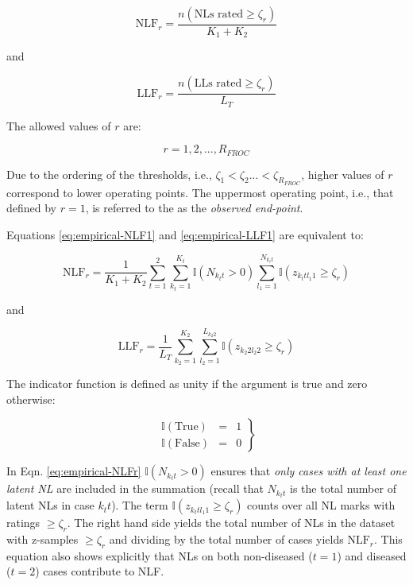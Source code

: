\documentclass[
]{book}
\begin{document}
\begin{equation}
\text{NLF}_r  = \frac{n\left ( \text{NLs rated} \geq \zeta_r\right )}{K_1 + K_2}
\label{eq:empirical-NLF1}
\end{equation}

and

\begin{equation}
\text{LLF}_r  = \frac{n\left ( \text{LLs rated} \geq \zeta_r\right )}{L_T}
\label{eq:empirical-LLF1}
\end{equation}

The allowed values of \(r\) are:

\begin{equation}
r = 1, 2, ...,R_{FROC} 
\label{eq:empirical-range-r}
\end{equation}

Due to the ordering of the thresholds, i.e., \(\zeta_1 < \zeta_2 ... < \zeta_{R_{FROC}}\), higher values of \(r\) correspond to lower operating points. The uppermost operating point, i.e., that defined by \(r = 1\), is referred to the as the \emph{observed end-point}.

Equations \eqref{eq:empirical-NLF1} and \eqref{eq:empirical-LLF1} are equivalent to:

\begin{equation}
\text{NLF}_r  = \frac{1}{K_1+K_2} \sum_{t=1}^{2} \sum_{k_t=1}^{K_t} \mathbb{I} \left ( N_{k_t t} > 0 \right )\sum_{l_1=1}^{N_{k_t t}} \mathbb{I} \left ( z_{k_t t l_1 1} \geq \zeta_r \right ) 
\label{eq:empirical-NLFr}
\end{equation}

and

\begin{equation}
\text{LLF}_r  = \frac{1}{L_T} \sum_{k_2=1}^{K_2} \sum_{l_2=1}^{L_{k_2 2}} \mathbb{I} \left ( z_{k_2 2 l_2 2} \geq \zeta_r  \right ) 
\label{eq:empirical-LLFr}
\end{equation}

The indicator function is defined as unity if the argument is true and zero otherwise:

\begin{equation}
\left.
\begin{matrix}
\mathbb{I}\left( \text{True} \right) & = &  1\\
\mathbb{I}\left( \text{False} \right) & = & 0 
\end{matrix}
\right \}
\label{eq:empirical-indicator-function}
\end{equation}

In Eqn. \eqref{eq:empirical-NLFr} \(\mathbb{I} \left ( N_{k_t t} > 0 \right )\) ensures that \emph{only cases with at least one latent NL} are included in the summation (recall that \(N_{k_t t}\) is the total number of latent NLs in case \(k_t t\)). The term \(\mathbb{I} \left ( z_{k_t t l_1 1} \geq \zeta_r \right )\) counts over all NL marks with ratings \(\geq \zeta_r\). The right hand side yields the total number of NLs in the dataset with z-samples \(\geq \zeta_r\) and dividing by the total number of cases yields \(\text{NLF}_r\). This equation also shows explicitly that NLs on both non-diseased (\(t=1\)) and diseased (\(t=2\)) cases contribute to NLF.
\end{document}
